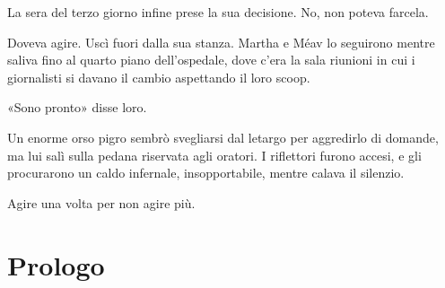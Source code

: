 \documentclass[a4paper,10pt]{memoir}
\begin{document}
La sera del terzo giorno infine prese la sua decisione. No, non poteva farcela.

Doveva agire. Uscì fuori dalla sua stanza. Martha e Méav lo seguirono mentre saliva fino al quarto piano dell’ospedale,
dove c’era la sala riunioni in cui i giornalisti si davano il cambio aspettando il loro scoop.

«Sono pronto» disse loro.

Un enorme orso pigro sembrò svegliarsi dal letargo per aggredirlo di domande, ma lui salì sulla pedana riservata agli
oratori. I riflettori furono accesi, e gli procurarono un caldo infernale, insopportabile, mentre calava il silenzio.

Agire una volta per non agire più.

\backmatter

\chapter{Prologo}
\end{document}
